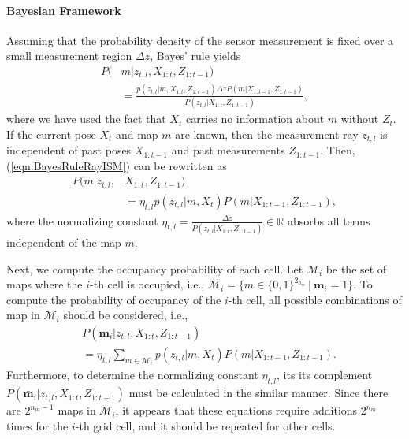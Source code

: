 \documentclass[letterpaper, 10pt, conference]{ieeeconf}
\newcommand{\refeqn}[1]{(\ref{eqn:#1})}
\renewcommand{\Re}{\ensuremath{\mathbb{R}}}
\newcommand{\EditTL}[1]{{\color{red}\protect #1}}
\begin{document}
\paragraph{Bayesian Framework}
Assuming that the probability density of the sensor measurement is fixed over a small measurement region $\Delta z$, Bayes' rule yields
\begin{align}
\label{eqn:BayesRuleRayISM}
P(&m|z_{t,l},X_{1:t},Z_{1:t-1})\nonumber
\\
&=\frac{p(z_{t,l}|m,X_{1:t},Z_{1:t-1})\Delta zP(m|X_{1:t-1},Z_{1:t-1})}{P(z_{t,l}|X_{1:t},Z_{1:t-1})},
\end{align}
where we have used the fact that $X_t$ carries no information about $m$ without $Z_t$.
If the current pose $X_t$ and map $m$ are known, then the measurement ray $z_{t,l}$ is independent of past poses $X_{1:t-1}$ and past measurements $Z_{1:t-1}$.
Then, \refeqn{BayesRuleRayISM} can be rewritten as
\begin{align}
P(m|z_{t,l},&X_{1:t},Z_{1:t-1})\nonumber
\\
&
=\eta_{t,l}p(z_{t,l}|m,X_{t})P(m|X_{1:t-1},Z_{1:t-1}),
\end{align}
where the normalizing constant $\eta_{t,l}=\frac{\Delta z}{P(z_{t,l}|X_{1:t},Z_{1:t-1})}\in\Re$ absorbs all terms independent of the map $m$.


Next, we compute the occupancy probability of each cell. Let $\mathcal{M}_i$ be the set of maps where the $i$-th cell is occupied, i.e., $\mathcal{M}_i =\{m\in\{0,1\}^{2_{n_m}}\,|\ \mathbf{m}_i=1\}$. To compute the probability of occupancy of the $i$-th cell, all possible combinations of map in $\mathcal{M}_i$ should be considered, i.e., 
\begin{align}
\label{eqn:InvSenModWithProbDens}
&P(\mathbf{m}_i|z_{t,l},X_{1:t},Z_{1:t-1})\nonumber
\\
&=\eta_{t,l}\sum_{m\in\mathcal{M}_i}p(z_{t,l}|m,X_{t})P(m|X_{1:t-1},Z_{1:t-1}).
\end{align}
Furthermore, to determine the normalizing constant $\eta_{t,l}$, its its complement $P(\bar{\mathbf{m}}_i|z_{t,l},X_{1:t},Z_{1:t-1})$ must be calculated in the similar manner. Since there are $2^{n_{m}-1}$ maps in $\mathcal{M}_i$, it appears that these equations require additions $2^{n_m}$ times for the $i$-th grid cell, and it should be repeated for other cells.
	
\end{document}
